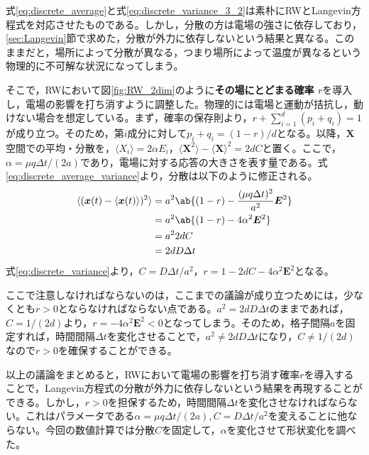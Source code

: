 \documentclass[autodetect-engine,dvi=dvipdfmx,a4paper,ja=standard,oneside,openany,11pt]{bxjsbook}
\begin{document}
式\eqref{eq:discrete_average}と式\eqref{eq:discrete_variance_3_2}は素朴にRWとLangevin方程式を対応させたものである。しかし，分散の方は電場の強さに依存しており，\ref{sec:Langevin}節で求めた，分散が外力に依存しないという結果と異なる。このままだと，場所によって分散が異なる，つまり場所によって温度が異なるという物理的に不可解な状況になってしまう。

そこで，RWにおいて図\ref{fig:RW_2dim}のように\textbf{その場にとどまる確率 $r$}を導入し，電場の影響を打ち消すように調整した。物理的には電場と運動が拮抗し，動けない場合を想定している。まず，確率の保存則より，$r+\sum_{i=1}^{d}(p_i+q_i) =1$が成り立つ。そのため，第$i$成分に対して$p_i+q_i=(1-r)/d$となる。以降，$\bm{X}$空間での平均・分散を，$\langle X_i\rangle=2\alpha E_i$，$\langle\bm{X}^2\rangle-\langle\bm{X}\rangle^2=2dC$と置く。ここで，$\alpha=\mu q\Delta t/(2a)$であり，電場に対する応答の大きさを表す量である。式\ref{eq:discrete_average_variance}より，分散は以下のように修正される。
\begin{equation}
  \begin{split}
    \langle(\bm{x}(t)-\langle\bm{x}(t)\rangle)^2\rangle & =a^2\ab\{(1-r)-\frac{(\mu q \Delta t)^2}{a^2}\bm{E}^2\} \\
                                                        & =a^2\ab\{(1-r)-4\alpha^2\bm{E}^2\}                      \\
                                                        & =a^2 2dC                                                \\
                                                        & =2dD\Delta t
  \end{split}
  \label{eq:discrete_variance}
\end{equation}
式\eqref{eq:discrete_variance}より，$C=D\Delta t/a^2$，$r=1-2dC-4\alpha^2\bm{E}^2$となる。

ここで注意しなければならないのは，ここまでの議論が成り立つためには，少なくとも$r>0$とならなければならない点である。$a^2=2dD\Delta t$のままであれば，$C=1/(2d)$より，$r=-4\alpha^2\bm{E}^2<0$となってしまう。そのため，格子間隔$a$を固定すれば，時間間隔$\Delta t$を変化させることで，$a^2\neq2dD\Delta t$になり，$C\neq1/(2d)$なので$r>0$を確保することができる。

以上の議論をまとめると，RWにおいて電場の影響を打ち消す確率$r$を導入することで，Langevin方程式の分散が外力に依存しないという結果を再現することができる。しかし，$r>0$を担保するため，時間間隔$\Delta t$を変化させなければならない。これはパラメータである$\alpha=\mu q\Delta t/(2a),C=D\Delta t/a^2$を変えることに他ならない。今回の数値計算では分散$C$を固定して，$\alpha$を変化させて形状変化を調べた。
\end{document}
